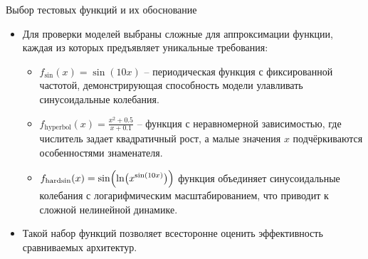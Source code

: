 \documentclass
  [ russian
  , aspectratio=1610 %
  ] {beamer}
\begin{document}
\begin{frame}{Выбор тестовых функций и их обоснование}
    \begin{itemize}
        \item Для проверки моделей выбраны сложные для аппроксимации функции, каждая из которых предъявляет уникальные требования:
              \begin{itemize}
                  \begin{itemize}
                \item \(\displaystyle f_{\sin}(x)=\sin(10x)\) – периодическая функция с фиксированной частотой, демонстрирующая способность модели улавливать синусоидальные колебания.
                \item \(\displaystyle f_{\text{hyperbol}}(x)=\frac{x^2+0.5}{x+0.1}\) – функция с неравномерной зависимостью, где числитель задает квадратичный рост, а малые значения \(x\) подчёркиваются особенностями знаменателя.
                \item \(\displaystyle f_{\text{hardsin}}(x)=\sin\Bigl(\ln\bigl(x^{\sin(10x)}\bigr)\Bigr)\) функция объединяет синусоидальные колебания с логарифмическим масштабированием, что приводит к сложной нелинейной динамике.
                    \end{itemize}

              \end{itemize}
        \item Такой набор функций позволяет всесторонне оценить эффективность сравниваемых архитектур.
    \end{itemize}
\end{frame}
\end{document}
